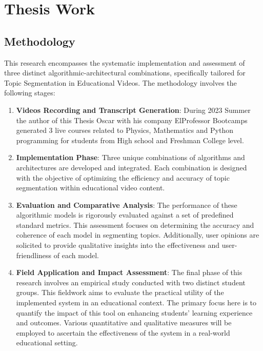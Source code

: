 


\chapter{Thesis Work}
\label{chapter:chapter03}


\section{Methodology}


This research encompasses the systematic implementation and assessment of three distinct algorithmic-architectural combinations, specifically tailored for Topic Segmentation in Educational Videos. The methodology involves the following stages:

\begin{enumerate}

    \item \textbf{Videos Recording and Transcript Generation}: During 2023 Summer the author of this Thesis Oscar with his company ElProfessor Bootcamps generated 3 live courses related to Physics, Mathematics and Python programming for students from High school and Freshman College level.



    \item \textbf{Implementation Phase}: Three unique combinations of algorithms and architectures are developed and integrated. Each combination is designed with the objective of optimizing the efficiency and accuracy of topic segmentation within educational video content.

    \item \textbf{Evaluation and Comparative Analysis}: The performance of these algorithmic models is rigorously evaluated against a set of predefined standard metrics. This assessment focuses on determining the accuracy and coherence of each model in segmenting topics. Additionally, user opinions are solicited to provide qualitative insights into the effectiveness and user-friendliness of each model.

    \item \textbf{Field Application and Impact Assessment}: The final phase of this research involves an empirical study conducted with two distinct student groups. This fieldwork aims to evaluate the practical utility of the implemented system in an educational context. The primary focus here is to quantify the impact of this tool on enhancing students' learning experience and outcomes. Various quantitative and qualitative measures will be employed to ascertain the effectiveness of the system in a real-world educational setting.
\end{enumerate}

